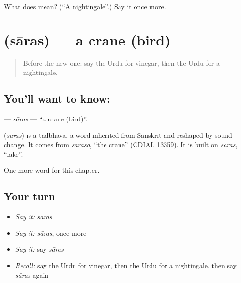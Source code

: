 \begin{tcolorbox}[breakable,colback=teal!4,colframe=teal!35!black,title={Before you move on}]
What does  mean? (\textquotedblleft{}A nightingale\textquotedblright{}.) Say it once more.
\end{tcolorbox}
\section[\texorpdfstring{\ur{سارس} (sāras)}{سارس (sāras)}]{ (sāras) — a crane (bird)}

\label{lesson:UR-C208-saras}



\begin{quote}
Before the new one: say the Urdu for vinegar, then the Urdu for a nightingale.
\end{quote}

\subsection*{You'll want to know: }
\textbf{} — \emph{sāras} — \textquotedblleft{}a crane (bird)\textquotedblright{}.

\begin{cousinweb}
\textbf{} (\emph{sāras}) is a tadbhava, a word inherited from Sanskrit and reshaped by sound change. It comes from \emph{sārasa}, \textquotedblleft{}the crane\textquotedblright{} (CDIAL 13359). It is built on \emph{saras}, \textquotedblleft{}lake\textquotedblright{}.
\end{cousinweb}

\begin{grammarlens}[title={What you've built}]
One more word for this chapter.
\end{grammarlens}

\subsection*{Your turn}
\begin{itemize}
\raggedright
  \item \emph{Say it:} \emph{sāras}
  \item \emph{Say it:} \emph{sāras}, once more
  \item \emph{Say it:} say \emph{sāras}
  \item \emph{Recall:} say the Urdu for vinegar, then the Urdu for a nightingale, then say \emph{sāras} again
\end{itemize}

